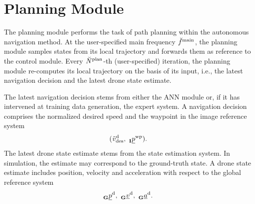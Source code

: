 \section{Planning Module}
The planning module performs the task of path planning
within the autonomous navigation method.
At the user-specified main frequency 
$\freq[\user]{\main}{}{}{}$,
the planning module 
samples states from its local trajectory
and forwards them as reference to the control module.
Every $\num[\user]{\text{plan}}{}{}{}$-th (user-specified) iteration,
the planning module re-computes its local trajectory
on the basis of its input,
i.e., the latest navigation decision and the latest drone state estimate. 

The latest navigation decision
stems from either the ANN module
or, if it has intervened at training data generation,
the expert system.
A navigation decision comprises the normalized desired speed 
and the waypoint in the image reference system
\begin{equation}
    (
        \speed[\norm]{\drone}{\desired}{}{}
        ,\ 
        \pos[]{\wayp}{}{\irs}{}
    ).
\end{equation}
The latest drone state estimate stems from the state estimation system.
In simulation, the estimate may correspond to the ground-truth state.
A drone state estimate includes position, velocity and acceleration
with respect to the global reference system
\begin{equation} \label{eq:drone_state}
    \pos[]{\drone}{}{\grs}{}
    ,\ 
    \vel[]{\drone}{}{\grs}{}
    ,\ 
    \acc[]{\drone}{}{\grs}{}.
\end{equation}


